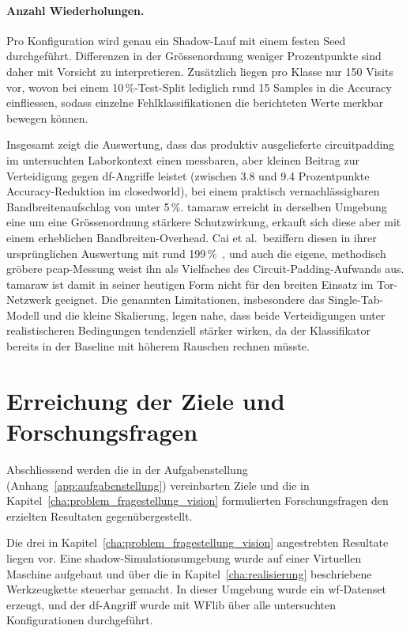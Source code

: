 \paragraph{Anzahl Wiederholungen.}
Pro Konfiguration wird genau ein Shadow-Lauf mit einem festen Seed durchgeführt.
Differenzen in der Grössenordnung weniger Prozentpunkte sind daher mit Vorsicht zu interpretieren.
Zusätzlich liegen pro Klasse nur 150 Visits vor, wovon bei einem 10\,\%-Test-Split lediglich rund 15 Samples in die Accuracy einfliessen, sodass einzelne Fehlklassifikationen die berichteten Werte merkbar bewegen können.

Insgesamt zeigt die Auswertung, dass das produktiv ausgelieferte \gls{circuitpadding} im untersuchten Laborkontext einen messbaren, aber kleinen Beitrag zur Verteidigung gegen \gls{df}-Angriffe leistet (zwischen 3.8 und 9.4 Prozentpunkte Accuracy-Reduktion im \gls{closedworld}), bei einem praktisch vernachlässigbaren Bandbreitenaufschlag von unter 5\,\%.
\gls{tamaraw} erreicht in derselben Umgebung eine um eine Grössenordnung stärkere Schutzwirkung, erkauft sich diese aber mit einem erheblichen Bandbreiten-Overhead.
Cai et al.\ beziffern diesen in ihrer ursprünglichen Auswertung mit rund 199\,\%~\cite{cai2014systematic}, und auch die eigene, methodisch gröbere \gls{pcap}-Messung weist ihn als Vielfaches des Circuit-Padding-Aufwands aus.
\gls{tamaraw} ist damit in seiner heutigen Form nicht für den breiten Einsatz im Tor-Netzwerk geeignet.
Die genannten Limitationen, insbesondere das Single-Tab-Modell und die kleine Skalierung, legen nahe, dass beide Verteidigungen unter realistischeren Bedingungen tendenziell stärker wirken, da der Klassifikator bereits in der Baseline mit höherem Rauschen rechnen müsste.

\section{Erreichung der Ziele und Forschungsfragen}
\label{sec:eval_zielerreichung}

Abschliessend werden die in der Aufgabenstellung (Anhang~\ref{app:aufgabenstellung}) vereinbarten Ziele und die in Kapitel~\ref{cha:problem_fragestellung_vision} formulierten Forschungsfragen den erzielten Resultaten gegenübergestellt.

Die drei in Kapitel~\ref{cha:problem_fragestellung_vision} angestrebten Resultate liegen vor.
Eine \gls{shadow}-Simulationsumgebung wurde auf einer Virtuellen Maschine aufgebaut und über die in Kapitel~\ref{cha:realisierung} beschriebene Werkzeugkette steuerbar gemacht.
In dieser Umgebung wurde ein \gls{wf}-Datenset erzeugt, und der \gls{df}-Angriff wurde mit WFlib über alle untersuchten Konfigurationen durchgeführt.

